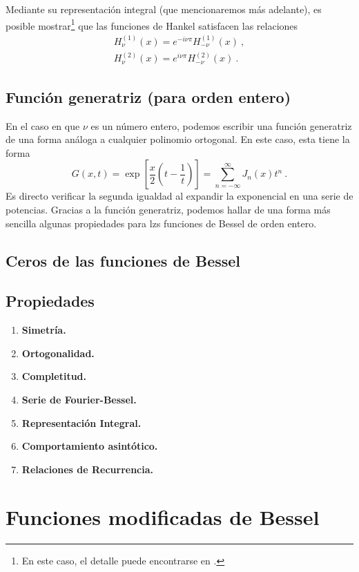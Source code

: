 Mediante su representación integral (que mencionaremos más adelante), es posible mostrar\footnote{En este caso, el detalle puede encontrarse en \cite{Arfken}.} que las funciones de Hankel satisfacen las relaciones
\begin{align}
    H_\nu^{(1)}(x) = e^{-i\nu\pi} H_{-\nu}^{(1)}(x) \ , \\
    H_\nu^{(2)}(x) = e^{i\nu\pi} H_{-\nu}^{(2)}(x) \ .
\end{align}


\subsection{Función generatriz (para orden entero)}

En el caso en que $\nu$ es un número entero, podemos escribir una función generatriz de una forma análoga a cualquier polinomio ortogonal. En este caso, esta tiene la forma
\begin{equation}
    G(x,t) = \exp\left[ \frac{x}{2} \left( t - \frac{1}{t} \right) \right] = \sum_{n = -\infty}^\infty J_n(x) t^n \ .
\end{equation}
Es directo verificar la segunda igualdad al expandir la exponencial en una serie de potencias. Gracias a la función generatriz, podemos hallar de una forma más sencilla algunas propiedades para lzs funciones de Bessel de orden entero.

\subsection{Ceros de las funciones de Bessel}


\subsection{Propiedades}
\begin{enumerate}
    \item \textbf{Simetría.}
    \item \textbf{Ortogonalidad.}
    \item \textbf{Completitud.}
    \item \textbf{Serie de Fourier-Bessel.}
    \item \textbf{Representación Integral.}
    \item \textbf{Comportamiento asintótico.}
    \item \textbf{Relaciones de Recurrencia.}
\end{enumerate}


\section{Funciones modificadas de Bessel}

